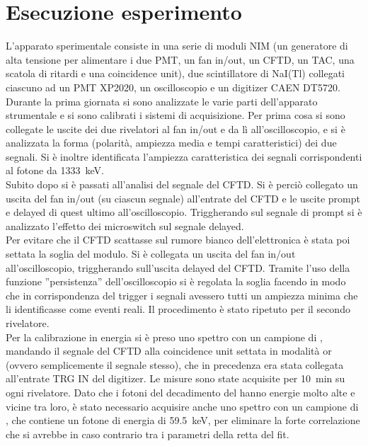 \section{Esecuzione esperimento}
L'apparato sperimentale consiste in una serie di moduli NIM (un generatore di alta tensione per alimentare i due PMT, un fan in/out, un CFTD, un TAC, una scatola di ritardi e una coincidence unit), due scintillatore di NaI(Tl) collegati ciascuno ad un PMT XP2020, un oscilloscopio e un digitizer CAEN DT5720.\\

Durante la prima giornata si sono analizzate le varie parti dell'apparato strumentale e si sono calibrati i sistemi di acquisizione. Per prima cosa si sono collegate le uscite dei due rivelatori al fan in/out e da lì all'oscilloscopio, e si è analizzata la forma (polarità, ampiezza media e tempi caratteristici) dei due segnali. Si è inoltre identificata l'ampiezza caratteristica dei segnali corrispondenti al fotone da 1333~keV.\\

Subito dopo si è passati all'analisi del segnale del CFTD. Si è perciò collegato un uscita del fan in/out (su ciascun segnale) all'entrate del CFTD e le uscite prompt e delayed di quest ultimo all'oscilloscopio. Triggherando sul segnale di prompt si è analizzato l'effetto dei microswitch sul segnale delayed.\\

Per evitare che il CFTD scattasse sul rumore bianco dell'elettronica è stata poi settata la soglia del modulo. Si è collegata un uscita del fan in/out all'oscilloscopio, triggherando sull'uscita delayed del CFTD. Tramite l'uso della funzione ''persistenza'' dell'oscilloscopio si è regolata la soglia facendo in modo che in corrispondenza del trigger i segnali avessero tutti un ampiezza minima che li identificasse come eventi reali. Il procedimento è stato ripetuto per il secondo rivelatore.\\

Per la calibrazione in energia si è preso uno spettro con un campione di , mandando il segnale del CFTD alla coincidence unit settata in modalità or (ovvero semplicemente il segnale stesso), che in precedenza era stata collegata all'entrate TRG IN del digitizer. Le misure sono state acquisite per 10~min su ogni rivelatore. Dato che i fotoni del decadimento del  hanno energie molto alte e vicine tra loro, è stato necessario acquisire anche uno spettro con un campione di , che contiene un fotone di energia di 59.5~keV, per eliminare la forte correlazione che si avrebbe in caso contrario tra i parametri della retta del fit.\\

